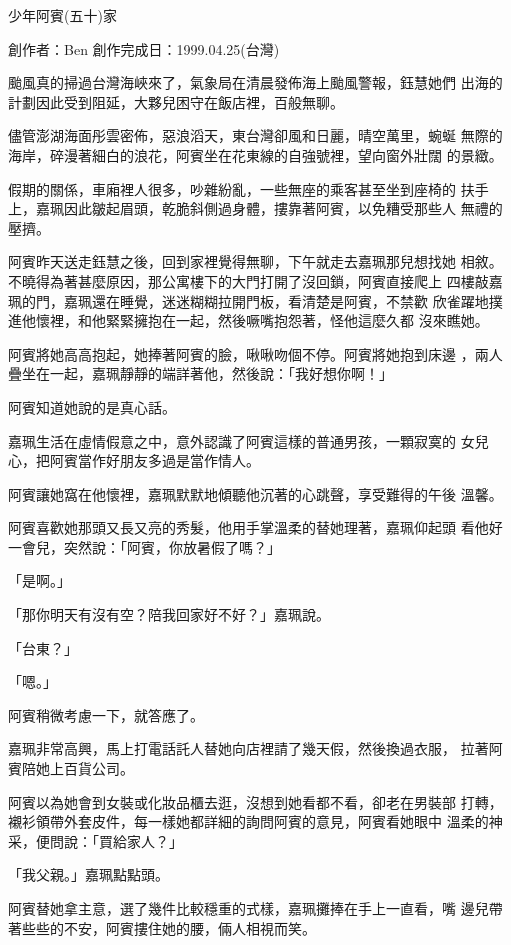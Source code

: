 



少年阿賓(五十)家

創作者：Ben
創作完成日：1999.04.25(台灣)


颱風真的掃過台灣海峽來了，氣象局在清晨發佈海上颱風警報，鈺慧她們
出海的計劃因此受到阻延，大夥兒困守在飯店裡，百般無聊。

儘管澎湖海面彤雲密佈，惡浪滔天，東台灣卻風和日麗，晴空萬里，蜿蜒
無際的海岸，碎漫著細白的浪花，阿賓坐在花東線的自強號裡，望向窗外壯闊
的景緻。

假期的關係，車廂裡人很多，吵雜紛亂，一些無座的乘客甚至坐到座椅的
扶手上，嘉珮因此皺起眉頭，乾脆斜側過身體，摟靠著阿賓，以免糟受那些人
無禮的壓擠。

阿賓昨天送走鈺慧之後，回到家裡覺得無聊，下午就走去嘉珮那兒想找她
相敘。不曉得為著甚麼原因，那公寓樓下的大門打開了沒回鎖，阿賓直接爬上
四樓敲嘉珮的門，嘉珮還在睡覺，迷迷糊糊拉開門板，看清楚是阿賓，不禁歡
欣雀躍地撲進他懷裡，和他緊緊擁抱在一起，然後噘嘴抱怨著，怪他這麼久都
沒來瞧她。

阿賓將她高高抱起，她捧著阿賓的臉，啾啾吻個不停。阿賓將她抱到床邊
，兩人疊坐在一起，嘉珮靜靜的端詳著他，然後說：「我好想你啊！」

阿賓知道她說的是真心話。

嘉珮生活在虛情假意之中，意外認識了阿賓這樣的普通男孩，一顆寂寞的
女兒心，把阿賓當作好朋友多過是當作情人。

阿賓讓她窩在他懷裡，嘉珮默默地傾聽他沉著的心跳聲，享受難得的午後
溫馨。

阿賓喜歡她那頭又長又亮的秀髮，他用手掌溫柔的替她理著，嘉珮仰起頭
看他好一會兒，突然說：「阿賓，你放暑假了嗎？」

「是啊。」

「那你明天有沒有空？陪我回家好不好？」嘉珮說。

「台東？」

「嗯。」

阿賓稍微考慮一下，就答應了。

嘉珮非常高興，馬上打電話託人替她向店裡請了幾天假，然後換過衣服，
拉著阿賓陪她上百貨公司。

阿賓以為她會到女裝或化妝品櫃去逛，沒想到她看都不看，卻老在男裝部
打轉，襯衫領帶外套皮件，每一樣她都詳細的詢問阿賓的意見，阿賓看她眼中
溫柔的神采，便問說：「買給家人？」

「我父親。」嘉珮點點頭。

阿賓替她拿主意，選了幾件比較穩重的式樣，嘉珮攤捧在手上一直看，嘴
邊兒帶著些些的不安，阿賓摟住她的腰，倆人相視而笑。

